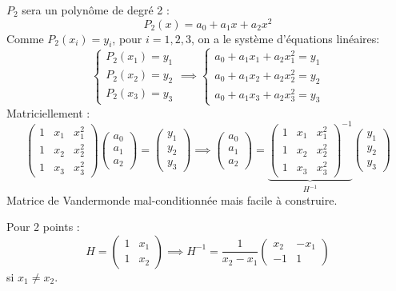 \documentclass[oneside]{book}
\begin{document}
$P_2$ sera un polynôme de degré 2 :
\[
P_2(x) = a_0 + a_1 x + a_2 x^2
\]
Comme $P_2(x_i) = y_i$, pour $i=1, 2, 3$, on a le système d'équations linéaires:
\[
\begin{cases}
P_2(x_1) = y_1 \\
P_2(x_2) = y_2 \\
P_2(x_3) = y_3
\end{cases}
\implies
\begin{cases}
a_0 + a_1 x_1 + a_2 x_1^2 = y_1 \\
a_0 + a_1 x_2 + a_2 x_2^2 = y_2 \\
a_0 + a_1 x_3 + a_2 x_3^2 = y_3
\end{cases}
\]
Matriciellement :
\[
\begin{pmatrix}
1 & x_1 & x_1^2 \\
1 & x_2 & x_2^2 \\
1 & x_3 & x_3^2
\end{pmatrix}
\begin{pmatrix} a_0 \\ a_1 \\ a_2 \end{pmatrix} = \begin{pmatrix} y_1 \\ y_2 \\ y_3 \end{pmatrix}
\implies
\begin{pmatrix} a_0 \\ a_1 \\ a_2 \end{pmatrix} = \underbrace{ \begin{pmatrix}
1 & x_1 & x_1^2 \\
1 & x_2 & x_2^2 \\
1 & x_3 & x_3^2
\end{pmatrix}^{-1} }_{H^{-1}} \begin{pmatrix} y_1 \\ y_2 \\ y_3 \end{pmatrix}
\]
Matrice de Vandermonde mal-conditionnée mais facile à construire.

\begin{remark}
Pour 2 points :
\[
H = \begin{pmatrix} 1 & x_1 \\ 1 & x_2 \end{pmatrix}
\implies
H^{-1} = \frac{1}{x_2-x_1} \begin{pmatrix} x_2 & -x_1 \\ -1 & 1 \end{pmatrix}
\]
si $x_1 \neq x_2$.
\end{remark}
\end{document}
